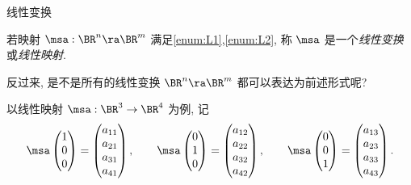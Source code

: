\begin{frame}{线性变换\noexer}
	\onslide<+->
	\begin{definition}
		若映射 $\msa:\BR^n\ra\BR^m$ 满足\ref{enum:L1},\ref{enum:L2}, 称 $\msa$ 是一个\emph{线性变换}或\emph{线性映射}.
	\end{definition}
	\onslide<+->
	反过来, 是不是所有的线性变换 $\BR^n\ra\BR^m$ 都可以表达为前述形式呢?

	\onslide<+->
	以线性映射 $\msa:\BR^3\to\BR^4$ 为例,
	\onslide<+->
	记
	\[\msa\begin{pmatrix}
		1\\0\\0
	\end{pmatrix}=\begin{pmatrix}
		a_{11}\\a_{21}\\a_{31}\\a_{41}
	\end{pmatrix},\qquad
	\msa\begin{pmatrix}
		0\\1\\0
	\end{pmatrix}=\begin{pmatrix}
		a_{12}\\a_{22}\\a_{32}\\a_{42}
	\end{pmatrix},\qquad
	\msa\begin{pmatrix}
		0\\0\\1
	\end{pmatrix}=\begin{pmatrix}
		a_{13}\\a_{23}\\a_{33}\\a_{43}
	\end{pmatrix}.\]
\end{frame}


